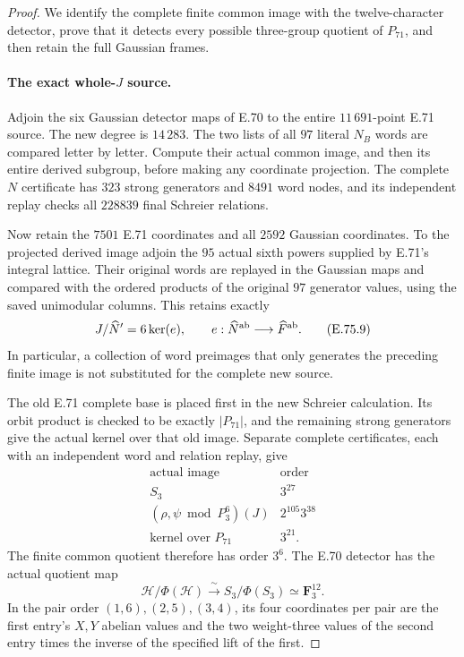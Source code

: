 \begin{proof}
We identify the complete finite common image with the
twelve-character detector, prove that it detects every possible
three-group quotient of $P_{71}$, and then retain the full
Gaussian frames.

\paragraph{The exact whole-$J$ source.}
Adjoin the six Gaussian detector maps of E.70 to the entire
$11\,691$-point E.71 source. The new degree is $14\,283$.
The two lists of all $97$ literal $N_B$ words are compared
letter by letter. Compute their actual common image, and
then its entire derived subgroup, before making any
coordinate projection. The complete $N$ certificate has
$323$ strong generators and $8491$ word nodes, and its
independent replay checks all $228839$ final Schreier
relations.

Now retain the $7501$ E.71 coordinates and all $2592$
Gaussian coordinates. To the projected derived image
adjoin the $95$ actual sixth powers supplied by E.71's
integral lattice. Their original words are replayed in the
Gaussian maps and compared with the ordered products of
the original $97$ generator values, using the saved
unimodular columns. This retains exactly
\[
       J/\widehat N'=6\ker(e),
       \qquad e:\widehat N^{\rm ab}\longrightarrow
                         \widehat F^{\rm ab}.
 \tag{E.75.9}
\]
In particular, a collection of word preimages that only
generates the preceding finite image is not substituted
for the complete new source.

The old E.71 complete base is placed first in the new
Schreier calculation. Its orbit product is checked to be
exactly $|P_{71}|$, and the remaining strong generators
give the actual kernel over that old image. Separate
complete certificates, each with an independent word
and relation replay, give
\[
 \begin{array}{c|c}
 \text{actual image}&\text{order}\\\hline
 S_3&3^{27}\\
 (\rho,\psi\bmod P_3^6)(J)&2^{105}3^{38}\\
 \text{kernel over }P_{71}&3^{21}.
 \end{array}
 \tag{E.75.10}
\]
The finite common quotient therefore has order $3^6$.
The E.70 detector has the actual quotient map
\[
 \mathcal H/\Phi(\mathcal H)
       \xrightarrow{\ \sim\ }S_3/\Phi(S_3)
       \simeq\mathbf F_3^{12}.
 \tag{E.75.11}
\]
In the pair order $(1,6),(2,5),(3,4)$, its four
coordinates per pair are the first entry's $X,Y$
abelian values and the two weight-three values of
the second entry times the inverse of the specified
lift of the first.


\end{proof}

